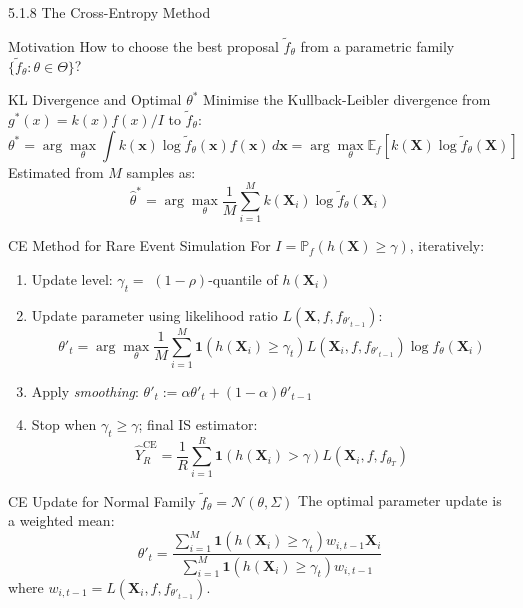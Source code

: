 \documentclass[aspectratio=169,10pt]{beamer}
\begin{document}
\begin{frame}[allowframebreaks]{5.1.8 The Cross-Entropy Method}

  \begin{block}{Motivation}
    How to choose the best proposal $\tilde{f}_\theta$ from a parametric family
    $\{\tilde{f}_\theta : \theta \in \Theta\}$?
  \end{block}

  \begin{block}{KL Divergence and Optimal $\theta^*$}
    Minimise the Kullback-Leibler divergence from $g^*(x) = k(x)f(x)/I$
    to $\tilde{f}_\theta$:
    \[
      \theta^* = \arg\max_\theta \int k(\mathbf{x})\log\tilde{f}_\theta(\mathbf{x})
      f(\mathbf{x})\,d\mathbf{x}
      = \arg\max_\theta \mathbb{E}_f\!\left[k(\mathbf{X})\log\tilde{f}_\theta(\mathbf{X})\right]
    \]
    Estimated from $M$ samples as:
    \[
      \hat{\theta}^* = \arg\max_\theta \frac{1}{M}\sum_{i=1}^M
      k(\mathbf{X}_i)\log\tilde{f}_\theta(\mathbf{X}_i)
    \]
  \end{block}

  \framebreak

  \begin{block}{CE Method for Rare Event Simulation}
    For $I = \mathbb{P}_f(h(\mathbf{X}) \ge \gamma)$, iteratively:
    \begin{enumerate}
      \item Update level: $\gamma_t = $ $(1-\rho)$-quantile of $h(\mathbf{X}_i)$
      \item Update parameter using likelihood ratio $L(\mathbf{X}, f, f_{\theta'_{t-1}})$:
            \[
              \theta'_t = \arg\max_\theta \frac{1}{M}\sum_{i=1}^M
              \mathbf{1}(h(\mathbf{X}_i) \ge \gamma_t)
              L(\mathbf{X}_i, f, f_{\theta'_{t-1}})\log f_\theta(\mathbf{X}_i)
            \]
      \item Apply \emph{smoothing}: $\theta'_t := \alpha\theta'_t + (1-\alpha)\theta'_{t-1}$
      \item Stop when $\gamma_t \ge \gamma$; final IS estimator:
            \[
              \hat{Y}_R^{\mathrm{CE}} = \frac{1}{R}\sum_{i=1}^R
              \mathbf{1}(h(\mathbf{X}_i) > \gamma)L(\mathbf{X}_i, f, f_{\theta_T})
            \]
    \end{enumerate}
  \end{block}

  \framebreak

  \begin{block}{CE Update for Normal Family $\tilde{f}_\theta = \mathcal{N}(\theta, \Sigma)$}
    The optimal parameter update is a weighted mean:
    \[
      \theta'_t = \frac{\sum_{i=1}^M \mathbf{1}(h(\mathbf{X}_i)\ge\gamma_t)
      w_{i,t-1}\mathbf{X}_i}{\sum_{i=1}^M \mathbf{1}(h(\mathbf{X}_i)\ge\gamma_t) w_{i,t-1}}
    \]
    where $w_{i,t-1} = L(\mathbf{X}_i, f, f_{\theta'_{t-1}})$.
  \end{block}


\end{frame}
\end{document}
